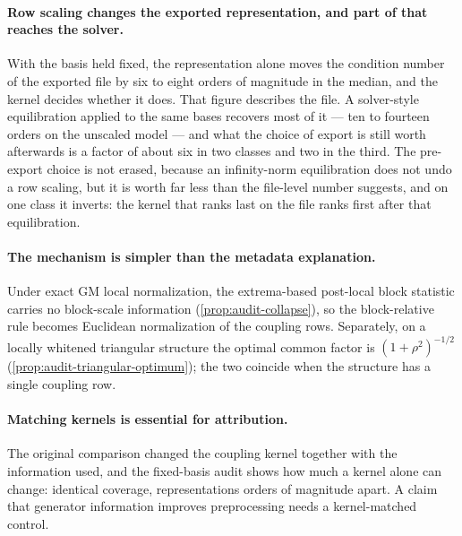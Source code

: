 \documentclass[smallextended,envcountsect,envcountsame]{svjour3}
\begin{document}
\paragraph{Row scaling changes the exported representation, and part of that reaches the
solver.} With the basis held fixed, the representation alone moves the condition number of the
exported file by six to eight orders of magnitude in the median, and the kernel decides whether
it does. That figure describes the file. A solver-style equilibration applied to the same bases
recovers most of it --- ten to fourteen orders on the unscaled model --- and what the choice of
export is still worth afterwards is a factor of about six in two classes and two in the third.
The pre-export choice is not erased, because an infinity-norm equilibration does not undo a row
scaling, but it is worth far less than the file-level number suggests, and on one class it
inverts: the kernel that ranks last on the file ranks first after that equilibration.

\paragraph{The mechanism is simpler than the metadata explanation.} Under exact GM local
normalization, the extrema-based post-local block statistic carries no block-scale information
(\cref{prop:audit-collapse}), so the block-relative rule becomes Euclidean normalization of the
coupling rows. Separately, on a locally whitened triangular structure the optimal common factor
is $(1+\rho^2)^{-1/2}$ (\cref{prop:audit-triangular-optimum}); the two coincide when the
structure has a single coupling row.

\paragraph{Matching kernels is essential for attribution.} The original comparison changed the
coupling kernel together with the information used, and the fixed-basis audit shows how much a
kernel alone can change: identical coverage, representations orders of magnitude apart. A claim
that generator information improves preprocessing needs a kernel-matched control.
\end{document}
